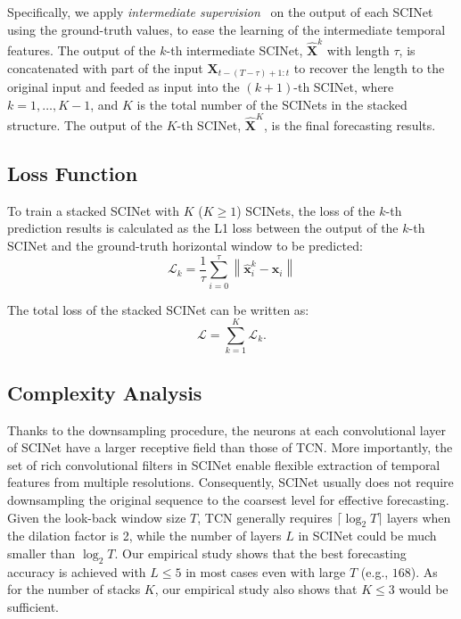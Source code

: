 \documentclass{article}
\begin{document}
Specifically, we apply \textit{intermediate supervision}~\citep{bai2018trellis} on the output of each SCINet using the ground-truth values, to ease the learning of the intermediate temporal features.
The output of the $k$-th intermediate SCINet, $\hat{\mathbf{X}}^{k}$ with length $\tau$, is concatenated with part of the input $\mathbf{X}_{t-(T-\tau)+1:t}$ to recover the length to the original input and feeded as input into the $(k\!+\!1)$-th SCINet, where $k=1, \dots, K\!-\!1$, and $K$ is the total number of the SCINets in the stacked structure.
The output of the $K$-th SCINet, $\hat{\mathbf{X}}^{K}$, is the final forecasting results. 



\subsection{Loss Function}
To train a stacked SCINet with $K$ ($K\geq 1$) SCINets, the loss of the $k$-th prediction results is calculated as the L1 loss between the output of the $k$-th SCINet and the ground-truth horizontal window to be predicted:
\begin{equation} \label{eq:mid_loss}
\mathcal{L}_{k} =  \frac{1}{\tau}\sum_{i=0}^{\tau}\left \| \hat{\mathbf{x}}^{k}_{i} - \mathbf{x}_{i} \right \| \end{equation}




The total loss of the stacked SCINet can be written as:
\begin{equation}
     \mathcal{L} = \sum_{k=1}^{K}\mathcal{L}_{k}.
\end{equation}


\subsection{Complexity Analysis}
Thanks to the downsampling procedure, the neurons at each convolutional layer of SCINet have a larger receptive field than those of TCN. More importantly, the set of rich convolutional filters in SCINet enable flexible extraction of temporal features from multiple resolutions. Consequently, SCINet usually does not require downsampling the original sequence to the coarsest level for effective forecasting. Given the look-back window size $T$, TCN generally requires $\lceil\log_2T\rceil$ layers when the dilation factor is 2, while the number of layers $L$ in SCINet could be much smaller than $\log_2T$. Our empirical study shows that the best forecasting accuracy is achieved with $L\!\leq\!5$ in most cases even with large $T$ (e.g., $168$). As for the number of stacks $K$, our empirical study also shows that $K\!\leq\!3$ would be sufficient.
\end{document}
